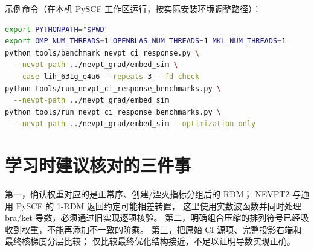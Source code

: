 \documentclass[UTF8,a4paper,11pt,fontset=fandol]{ctexart}
\begin{document}
示例命令（在本机 PySCF 工作区运行，按实际安装环境调整路径）：
\begin{lstlisting}[language=bash]
export PYTHONPATH="$PWD"
export OMP_NUM_THREADS=1 OPENBLAS_NUM_THREADS=1 MKL_NUM_THREADS=1
python tools/benchmark_nevpt_ci_response.py \
  --nevpt-path ../nevpt_grad/embed_sim \
  --case lih_631g_e4a6 --repeats 3 --fd-check
python tools/run_nevpt_ci_response_benchmarks.py \
  --nevpt-path ../nevpt_grad/embed_sim
python tools/run_nevpt_ci_response_benchmarks.py \
  --nevpt-path ../nevpt_grad/embed_sim --optimization-only
\end{lstlisting}

\section{学习时建议核对的三件事}
第一，确认权重对应的是正常序、创建/湮灭指标分组后的 RDM；
NEVPT2 与通用 PySCF 的 1-RDM 返回约定可能相差转置，
这里使用实数波函数并同时处理 bra/ket 导数，必须通过旧实现逐项核验。
第二，明确组合压缩的排列符号已经吸收到权重，不能再添加不一致的阶乘。
第三，把原始 CI 源项、完整投影右端和最终核梯度分层比较；
仅比较最终优化结构接近，不足以证明导数实现正确。
\end{document}
